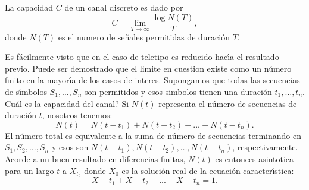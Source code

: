 \begin{definition}
La capacidad $C$ de un canal discreto es dado por
\begin{equation}
C = \lim_{T \rightarrow \infty} \frac{\log N(T)}{T},
\end{equation}
donde $N(T)$ es el numero de se\~{n}ales permitidas de duraci\'{o}n $T$.
\end{definition}

Es f\'{a}cilmente visto que en el caso de teletipo es reducido
hac\'{\i}a el resultado previo. Puede ser demostrado que el limite en
cuestion existe como un n\'{u}mero finito en la mayor\'{\i}a de los
casos de interes.  Supongamos que todas las secuencias de
s\'{\i}mbolos $S_1, \ldots, S_n$ son permitidos y esos simbolos tienen
una duraci\'{o}n $t_1, \ldots,t_n$. {\textquestiondown}Cu\'{a}l es la
capacidad del canal? Si $N(t)$ representa el n\'{u}mero de secuencias de
duraci\'{o}n $t$, nosotros tenemos:
\begin{equation}
N(t) = N(t-t_1) + N(t-t_2) + ... +N(t-t_n).
\end{equation}
El n\'{u}mero total es equivalente a la suma de n\'{u}mero de
secuencias terminando en $S_1, S_2, \ldots, S_n$ y esos son $N(t-t_1),
N(t-t_2), \ldots, N(t-t_n)$, respectivamente. Acorde a un buen
resultado en diferencias finitas, $N(t)$ es entonces asintotica para
un largo $t$ a $X_{t_0}$ donde $X_0$ es la soluci\'{o}n real de la
ecuaci\'{o}n caracter\'{\i}stica:
\begin{equation}
X-t_1 + X-t_2 + ... + X-t_n = 1.
\end{equation}

